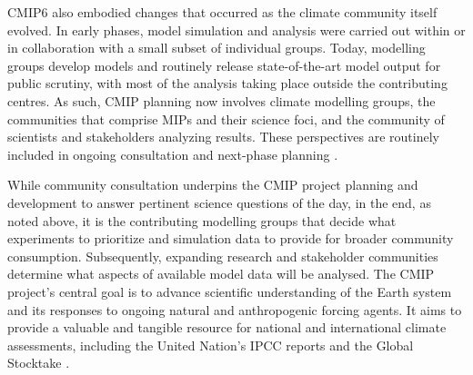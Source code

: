\documentclass[manuscript]{copernicus}
\begin{document}
CMIP6 also embodied changes that occurred as the climate community itself evolved. In early phases, model simulation and analysis were carried out within or in collaboration with a small subset of individual groups. Today, modelling groups develop models and routinely release state-of-the-art model output for public scrutiny, with most of the analysis taking place outside the contributing centres. As such, CMIP planning now involves climate modelling groups, the communities that comprise MIPs and their science foci, and the community of scientists and stakeholders analyzing results. These perspectives are routinely included in ongoing consultation and next-phase planning \citep{stouffer_cmip5_2017}.

While community consultation underpins the CMIP project planning and development to answer pertinent science questions of the day, in the end, as noted above, it is the contributing modelling groups that decide what experiments to prioritize and simulation data to provide for broader community consumption. Subsequently, expanding research and stakeholder communities determine what aspects of available model data will be analysed. The CMIP project's central goal is to advance scientific understanding of the Earth system and its responses to ongoing natural and anthropogenic forcing agents. It aims to provide a valuable and tangible resource for national and international climate assessments, including the United Nation's IPCC reports and the Global Stocktake \citep{stouffer_cmip5_2017}.


\end{document}
